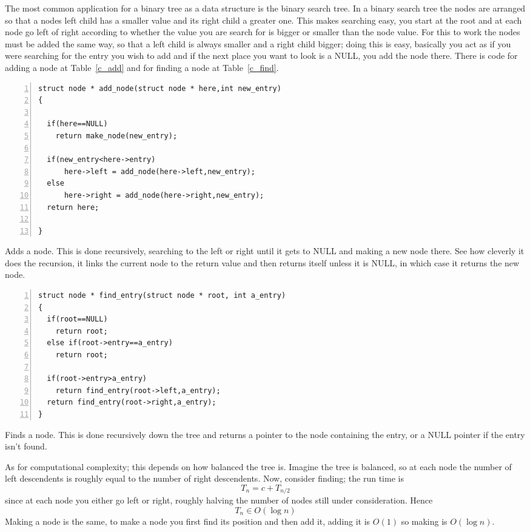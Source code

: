 \documentclass[11pt,a4paper]{scrartcl}
\begin{document}
The most common application for a binary tree as a data structure is
the binary search tree. In a binary search tree the nodes are arranged
so that a nodes left child has a smaller value and its right child a
greater one. This makes searching easy, you start at the root and at
each node go left of right according to whether the value you are
search for is bigger or smaller than the node value. For this to work
the nodes must be added the same way, so that a left child is always
smaller and a right child bigger; doing this is easy, basically you
act as if you were searching for the entry you wish to add and if the
next place you want to look is a NULL, you add the node there. There
is code for adding a node at Table~\ref{c_add} and for finding a node
at Table~\ref{c_find}.


\begin{table}
\begin{lstlisting}[numbers=left]
struct node * add_node(struct node * here,int new_entry)
{

  if(here==NULL)
    return make_node(new_entry);

  if(new_entry<here->entry)
      here->left = add_node(here->left,new_entry);
  else
      here->right = add_node(here->right,new_entry);
  return here;

}
\end{lstlisting}
\caption{Adds a node. This is done recursively, searching to the left
  or right until it gets to NULL and making a new node there. See how
  cleverly it does the recursion, it links the current node to the
  return value and then returns itself unless it is NULL, in which
  case it returns the new node.\label{c_add}}
\end{table}


\begin{table}
\begin{lstlisting}[numbers=left]
struct node * find_entry(struct node * root, int a_entry)
{
  if(root==NULL)
    return root;
  else if(root->entry==a_entry)
    return root;

  if(root->entry>a_entry)
    return find_entry(root->left,a_entry);
  return find_entry(root->right,a_entry);
}
\end{lstlisting}
\caption{Finds a node. This is done recursively down the tree and returns a pointer to the node containing the entry, or a NULL pointer if the entry isn't found.\label{c_find}}
\end{table}

As for computational complexity; this depends on how balanced the tree
is. Imagine the tree is balanced, so at each node the number of left
descendents is roughly equal to the number of right descendents. Now,
consider finding; the run time is
\begin{equation}
T_n=c+T_{n/2}
\end{equation}
since at each node you either go left or right, roughly halving the
number of nodes still under consideration. Hence
\begin{equation}
T_n\in O(\log n)
\end{equation}
Making a node is the same, to make a node you first find its position
and then add it, adding it is $O(1)$ so making is $O(\log{n})$.
\end{document}
